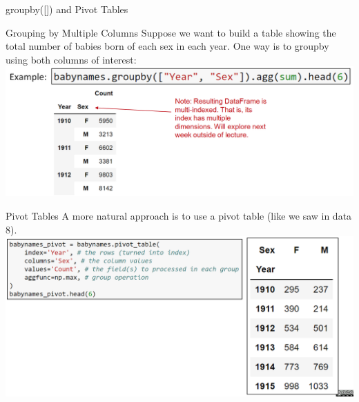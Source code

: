 \documentclass[aspectratio=169]{../latex_main/tntbeamer}  %
\begin{document}
    
    
    
    \begin{frame}{groupby([]) and Pivot Tables}

    \end{frame}
    
    
    
    
    \begin{frame}{Grouping by Multiple Columns}
      Suppose we want to build a table showing the total number of babies born of each sex in each year. One way is to groupby using both columns of interest:\\
        \centering
       \includegraphics[scale=.4]{Bild37}
    \end{frame}
    
    
    
    
     \begin{frame}{Pivot Tables}
      A more natural approach is to use a pivot table (like we saw in data 8).\\
        \centering
       \includegraphics[scale=.35]{Bild38}
    \end{frame}
    
    
    
\end{document}
